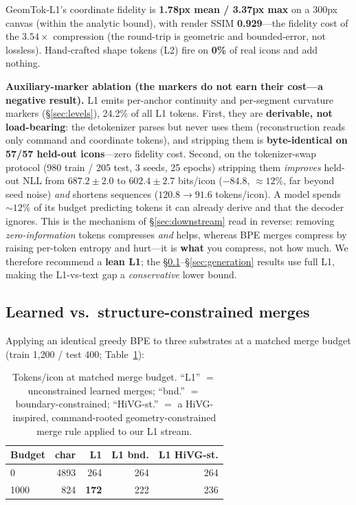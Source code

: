 \documentclass[11pt]{article}
\begin{document}
GeomTok-L1's coordinate fidelity is \textbf{1.78px mean / 3.37px max} on a 300px canvas (within the analytic bound), with render SSIM \textbf{0.929}---the fidelity cost of the $3.54\times$ compression (the round-trip is geometric and bounded-error, not lossless). Hand-crafted shape tokens (L2) fire on \textbf{0\%} of real icons and add nothing.

\textbf{Auxiliary-marker ablation (the markers do not earn their cost---a negative result).} L1 emits per-anchor continuity and per-segment curvature markers (\S\ref{sec:levels}), 24.2\% of all L1 tokens. First, they are \textbf{derivable, not load-bearing}: the detokenizer parses but never uses them (reconstruction reads only command and coordinate tokens), and stripping them is \textbf{byte-identical on 57/57 held-out icons}---zero fidelity cost. Second, on the tokenizer-swap protocol (980 train / 205 test, 3 seeds, 25 epochs) stripping them \emph{improves} held-out NLL from $687.2\pm2.0$ to $602.4\pm2.7$ bits/icon ($-84.8$, ${\approx}12\%$, far beyond seed noise) \emph{and} shortens sequences ($120.8\rightarrow91.6$ tokens/icon). A model spends ${\sim}12\%$ of its budget predicting tokens it can already derive and that the decoder ignores. This is the mechanism of \S\ref{sec:downstream} read in reverse: removing \emph{zero-information} tokens compresses \emph{and} helps, whereas BPE merges compress by raising per-token entropy and hurt---it is \textbf{what} you compress, not how much. We therefore recommend a \textbf{lean L1}; the \S\ref{sec:merges}--\S\ref{sec:generation} results use full L1, making the L1-vs-text gap a \emph{conservative} lower bound.

\subsection{Learned vs.\ structure-constrained merges}
\label{sec:merges}
Applying an identical greedy BPE to three substrates at a matched merge budget (train 1{,}200 / test 400; Table~\ref{tab:merges}):

\begin{table}[t]
\centering
\small
\begin{tabular}{lrrrr}
\toprule
Budget & char & L1 & L1 bnd. & L1 HiVG-st. \\
\midrule
0 & 4893 & 264 & 264 & 264 \\
1000 & 824 & \textbf{172} & 222 & 236 \\
\bottomrule
\end{tabular}
\caption{Tokens/icon at matched merge budget. ``L1'' $=$ unconstrained learned merges; ``bnd.'' $=$ boundary-constrained; ``HiVG-st.'' $=$ a HiVG-inspired, command-rooted geometry-constrained merge rule applied to our L1 stream.}
\label{tab:merges}
\end{table}
\end{document}
